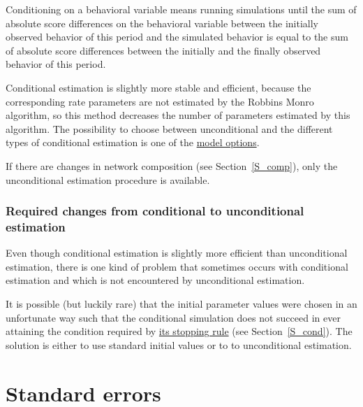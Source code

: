 \documentclass[a4paper,fleqn]{article}
\newcommand{\+}{\, + \,}
\begin{document}
{Conditioning on a behavioral variable means running simulations
until the sum of absolute score differences on the behavioral
variable between the initially observed behavior of this period
and the simulated behavior is equal to the sum of absolute score
differences between the initially and the finally observed
behavior of this period.

Conditional estimation is slightly more stable and efficient,
because the corresponding rate parameters are not estimated by the
Robbins Monro algorithm, so this method decreases the number of
parameters estimated by this algorithm.
The possibility to choose between
unconditional and the different types of conditional estimation is
one of the \hyperlink{T_S_options}{model options}.

If there are changes in network composition (see
Section~\ref{S_comp}), only the unconditional estimation procedure
is available.

\begin{print}
\end{print}

\subsubsection{Required changes from conditional to unconditional estimation}

Even though conditional estimation is slightly more efficient than
unconditional estimation, there is one kind of problem that
sometimes occurs with conditional estimation and which is not
encountered by unconditional estimation.

It is possible (but luckily rare) that the initial parameter
values were chosen in an unfortunate way such that the conditional
simulation does not succeed in ever attaining the condition required
by \hyperlink{T_distance_stop}{its stopping rule} (see
Section~\ref{S_cond}).
The solution is either to use standard initial values or to
to unconditional estimation.

\begin{print}
\end{print}
\hypertarget{T_se}{
\section{Standard errors}
}
\label{S_se}

}
\end{document}
